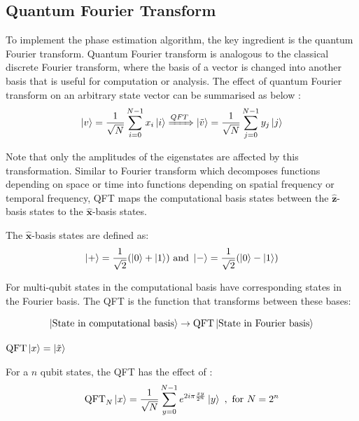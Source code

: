 \documentclass{article}
\begin{document}
\subsection{Quantum Fourier Transform}
To implement the phase estimation algorithm, the key ingredient is the quantum Fourier transform. Quantum Fourier transform is analogous to the classical discrete Fourier transform, where the basis of a vector is changed into another basis that is useful for computation or analysis. The effect of quantum Fourier transform on an arbitrary state vector can be summarised as below \cite{nielsen_quantum_2010}:
\begin{equation}
    \ket{v} = \frac{1}{\sqrt{N}} \sum_{i=0}^{N-1}{x_i \ket{i}} \xRightarrow{QFT} \ket{\Tilde{v}} = \frac{1}{\sqrt{N}}\sum_{j=0}^{N-1} y_j \ket{j}
\end{equation} 

\noindent
Note that only the amplitudes of the eigenstates are affected by this transformation. Similar to Fourier transform which decomposes functions depending on space or time into functions depending on spatial frequency or temporal frequency, QFT maps the computational basis states between the $\hat{\textbf{z}}$-basis states to the $\hat{\textbf{x}}$-basis states.
\vspace{5mm}

\noindent
The $\hat{\textbf{x}}$-basis states are defined as:
\vspace{5mm}
\begin{equation}
\ket{+} = \frac{1}{\sqrt{2}}(\ket{0} + \ket{1}) \ \text{and} \ \ket{-} = \frac{1}{\sqrt{2}}(\ket{0} - \ket{1})   
\end{equation}

\vspace{5mm}

\noindent
For multi-qubit states in the computational basis have corresponding states in the Fourier basis. The QFT is the function that transforms between these bases\cite{noauthor_quantum_nodate-1}:
\vspace{5mm}

\begin{equation}
\ket{\text{State in computational basis}} \rightarrow{\text{QFT}} \ket{\text{State in Fourier basis}}  
\end{equation}
\vspace{5mm}

\qquad $\text{QFT}\ket{x} = \ket{\tilde{x}}$
\vspace{5mm}

For a $n$ qubit states, the QFT has the effect of \cite{nielsen_quantum_2010}:
\vspace{5mm}
\begin{equation}
\text{QFT}_N\ket{x} = \frac{1}{\sqrt{N}} \sum\limits_{y=0}^{N-1}e^{2i\pi\frac{xy}{2^n}}\ket{y} \ , \ \text{for} \ N = 2^n    
\end{equation}
\end{document}

